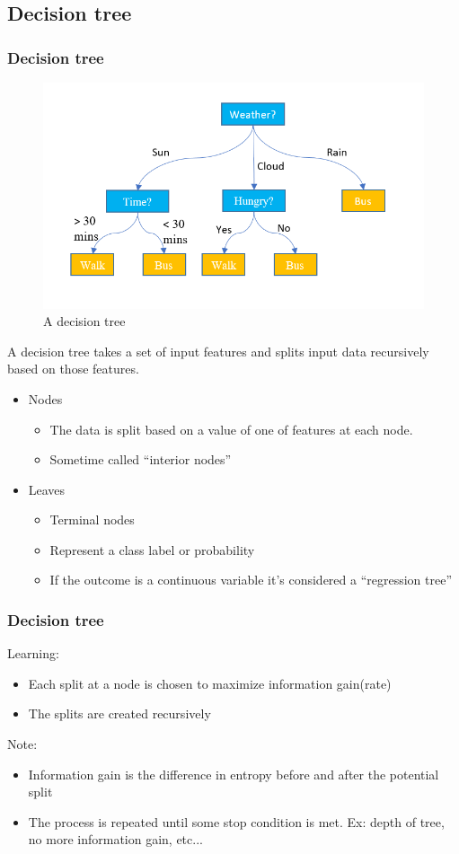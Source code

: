 \documentclass{beamer}
\begin{document}
\subsection{Decision tree}
\begin{frame}
\frametitle{Decision tree}
\begin{figure}[right]
\includegraphics[scale=0.23]{./figures/decision.png}
\caption{A decision tree}
\end{figure}
A decision tree takes a set of input features and splits input data
recursively based on those features.
\begin{itemize}
\item Nodes
\begin{itemize}
\item The data is split based on a value of one of features at each node.
\item Sometime called “interior nodes”
\end{itemize}
\item Leaves
\begin{itemize}
\item Terminal nodes
\item Represent a class label or probability
\item If the outcome is a continuous variable it’s considered a “regression tree”
\end{itemize}
\end{itemize}
\end{frame}

\begin{frame}
\frametitle{Decision tree}
Learning:
\begin{itemize}
\item Each split at a node is chosen to maximize information gain(rate)
\item The splits are created recursively
\end{itemize}
Note:
\begin{itemize}
\item Information gain is the difference in entropy before and after the potential split
\item The process is repeated until some stop condition is met.
Ex: depth of tree, no more information gain, etc...
\end{itemize}
\end{frame}
\end{document}
